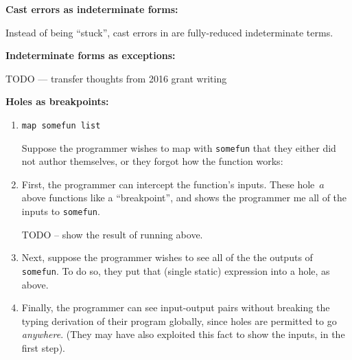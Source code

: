 \textbf{Cast errors as indeterminate forms:}

Instead of being ``stuck'', cast errors in \HazelnutLive are
fully-reduced indeterminate terms.


\textbf{Indeterminate forms as exceptions:}

TODO --- transfer thoughts from 2016 grant writing


\textbf{Holes as breakpoints:}

\begin{enumerate}

\item 
  \texttt{map somefun list}

Suppose the programmer wishes to map with \texttt{somefun} that they
either did not author themselves, or they forgot how the function
works:
  
\item 

First, the programmer can intercept the function's inputs.  These
hole~$a$ above functions like a ``breakpoint'', and shows the
programmer me all of the inputs to \texttt{somefun}.

TODO -- show the result of running above.

\item

  Next, suppose the programmer wishes to see all of the the outputs of
  \texttt{somefun}.  To do so, they put that (single static)
  expression into a hole, as above.

\item

  Finally, the programmer can see input-output pairs without breaking
  the typing derivation of their program globally, since holes are
  permitted to go \emph{anywhere}.  (They may have also exploited this
  fact to show the inputs, in the first step).
  
\end{enumerate}



